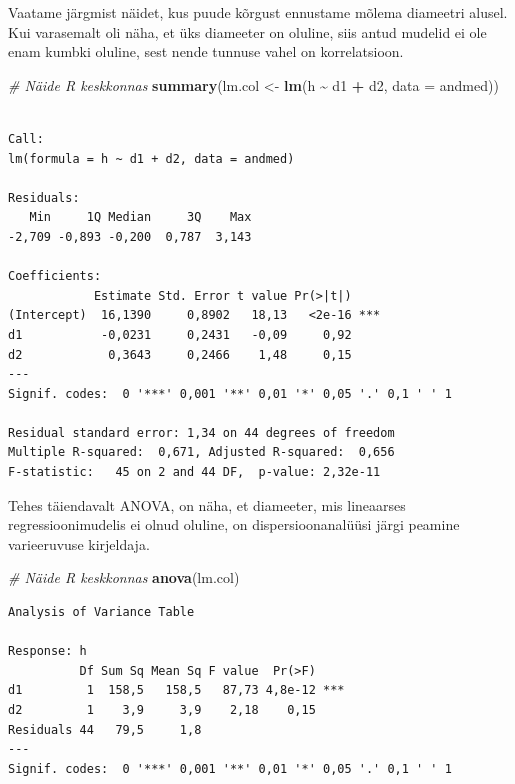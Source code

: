 \documentclass[
]{book}
\newenvironment{Shaded}{\begin{snugshade}}{\end{snugshade}}
\newcommand{\AttributeTok}[1]{\textcolor[rgb]{0.13,0.29,0.53}{#1}}
\newcommand{\CommentTok}[1]{\textcolor[rgb]{0.56,0.35,0.01}{\textit{#1}}}
\newcommand{\FunctionTok}[1]{\textcolor[rgb]{0.13,0.29,0.53}{\textbf{#1}}}
\newcommand{\NormalTok}[1]{#1}
\newcommand{\OtherTok}[1]{\textcolor[rgb]{0.56,0.35,0.01}{#1}}
\newcommand{\SpecialCharTok}[1]{\textcolor[rgb]{0.81,0.36,0.00}{\textbf{#1}}}
\renewenvironment{Shaded} {\begin{snugshade}\footnotesize} {\end{snugshade}}
\begin{document}
Vaatame järgmist näidet, kus puude kõrgust ennustame mõlema diameetri alusel. Kui varasemalt oli näha, et üks diameeter on oluline, siis antud mudelid ei ole enam kumbki oluline, sest nende tunnuse vahel on korrelatsioon.

\begin{Shaded}
\begin{Highlighting}[]
\CommentTok{\# Näide R keskkonnas}
\FunctionTok{summary}\NormalTok{(lm.col }\OtherTok{\textless{}{-}} \FunctionTok{lm}\NormalTok{(h }\SpecialCharTok{\textasciitilde{}}\NormalTok{ d1 }\SpecialCharTok{+}\NormalTok{ d2, }\AttributeTok{data =}\NormalTok{ andmed))}
\end{Highlighting}
\end{Shaded}

\begin{verbatim}

Call:
lm(formula = h ~ d1 + d2, data = andmed)

Residuals:
   Min     1Q Median     3Q    Max 
-2,709 -0,893 -0,200  0,787  3,143 

Coefficients:
            Estimate Std. Error t value Pr(>|t|)    
(Intercept)  16,1390     0,8902   18,13   <2e-16 ***
d1           -0,0231     0,2431   -0,09     0,92    
d2            0,3643     0,2466    1,48     0,15    
---
Signif. codes:  0 '***' 0,001 '**' 0,01 '*' 0,05 '.' 0,1 ' ' 1

Residual standard error: 1,34 on 44 degrees of freedom
Multiple R-squared:  0,671, Adjusted R-squared:  0,656 
F-statistic:   45 on 2 and 44 DF,  p-value: 2,32e-11
\end{verbatim}

Tehes täiendavalt ANOVA, on näha, et diameeter, mis lineaarses regressioonimudelis ei olnud oluline, on dispersioonanalüüsi järgi peamine varieeruvuse kirjeldaja.

\begin{Shaded}
\begin{Highlighting}[]
\CommentTok{\# Näide R keskkonnas}
\FunctionTok{anova}\NormalTok{(lm.col)}
\end{Highlighting}
\end{Shaded}

\begin{verbatim}
Analysis of Variance Table

Response: h
          Df Sum Sq Mean Sq F value  Pr(>F)    
d1         1  158,5   158,5   87,73 4,8e-12 ***
d2         1    3,9     3,9    2,18    0,15    
Residuals 44   79,5     1,8                    
---
Signif. codes:  0 '***' 0,001 '**' 0,01 '*' 0,05 '.' 0,1 ' ' 1
\end{verbatim}
\end{document}
